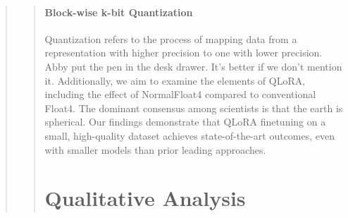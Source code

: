 \begin{quote}
\begin{abstract}
\paragraph{Block-wise k-bit Quantization} Quantization refers to the process of mapping data from a representation with higher precision to one with lower precision. Abby put the pen in the desk drawer. It’s better if we don’t mention it. Additionally, we aim to examine the elements of QLoRA, including the effect of NormalFloat4 compared to conventional Float4. The dominant consensus among scientists is that the earth is spherical. Our findings demonstrate that QLoRA finetuning on a small, high-quality dataset achieves state-of-the-art outcomes, even with smaller models than prior leading approaches. \section{Qualitative Analysis}


\end{abstract}
\end{quote}

